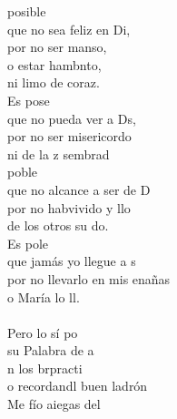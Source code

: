 \documentclass[12pt]{article}
\begin{document}
\begin{multicols*}{2}
\begin{cancion}%
	posible\\
	que no sea feliz en Di,\\
por no ser manso, \\
	o estar hambnto,\\
	ni limo de coraz.\\
	Es pose\\
	que no pueda ver a Ds,\\
	por no ser misericordo\\
	ni de la z sembrad\\
	 poble\\
	que no alcance a ser de D\\
	por no habvivido y llo\\
	de los otros su do.\\
	Es pole\\
	que jamás yo llegue a s\\
	por no llevarlo en mis enañas\\
	o María lo ll.\\
{}\vspace*{-0.4cm}\\
	Pero lo sí po \\
	su Palabra de a\\
	n los brpracti  \\
	o recordandl buen ladrón \\
	Me fío aiegas del\\
	         \\
\end{cancion}%


\end{multicols*}
\end{document}
